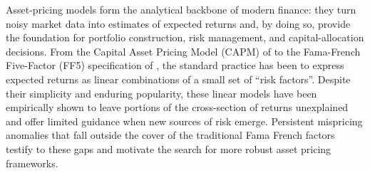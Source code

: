 
Asset-pricing models form the analytical backbone of modern finance: they turn noisy market data into estimates of expected returns and, by doing so, provide the foundation for portfolio construction, risk management, and capital-allocation decisions. From the Capital Asset Pricing Model (CAPM) of  to the Fama-French Five-Factor (FF5) specification of , the standard practice has been to express expected returns as linear combinations of a small set of “risk factors”. Despite their simplicity and enduring popularity, these linear models have been empirically shown to leave portions of the cross-section of returns unexplained and offer limited guidance when new sources of risk emerge. Persistent mispricing anomalies that fall outside the cover of the traditional Fama French factors testify to these gaps and motivate the search for more robust asset pricing frameworks.


